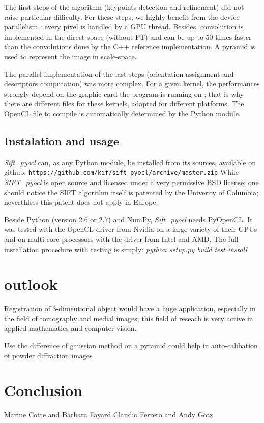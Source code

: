 \documentclass[preprint]{iucr}
\begin{document}
The first steps of the algorithm (keypoints detection and refinement) did not raise particular difficulty. For these steps, we highly benefit from the device parallelism : every pixel is handled by a GPU thread. Besides, convolution is implemented in the direct space (without FT) and can be up to 50 times faster than the convolutions done by the C++ reference implementation. A pyramid is used to represent the image in scale-space\cite{Lowe04}.

The parallel implementation of the last steps (orientation assignment and descriptors computation) was more complex. For a given kernel, the performances strongly depend on the graphic card the program is running on ; that is why there are different files for these kernels, adapted for different platforms. The OpenCL file to compile is automatically determined by the Python module.



\subsection{Instalation and usage}
\emph{Sift\_pyocl} can, as any Python module, be installed from its sources,
available on github:
\verb|https://github.com/kif/sift_pyocl/archive/master.zip|
While \emph{SIFT\_pyocl} is open source and licensed under a very
permissive BSD license; one should notice the SIFT algorithm itself is
patented by the Univerity of Columbia\cite{SIFT}; neverthless this patent does
not apply in Europe. %

Beside Python (version 2.6 or 2.7) and NumPy, \emph{Sift\_pyocl} needs
PyOpenCL\cite{pyopencl}.
It was tested with the OpenCL\cite{opencl} driver from Nvidia on a
large variety of their GPUs and on multi-core processors with the driver from
Intel and AMD. The full installation procedure with testing is simply:
\emph{python setup.py build test install}

\section{outlook}

Registration of 3-dimentional object would have a huge application, especially
in the field of tomography and medial images; this field of reseach is very
active in applied mathematics and computer vision.

Use the difference of gaussian method on a pyramid could help in auto-calibation
of powder diffraction images 

\section{Conclusion}

Marine Cotte and Barbara Fayard
Claudio Ferrero and Andy G\"otz





\end{document}
